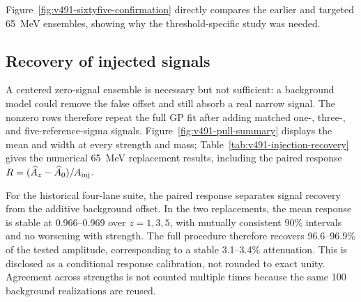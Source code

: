 Figure~\ref{fig:v491-sixtyfive-confirmation} directly compares the earlier and targeted
65~MeV ensembles, showing why the threshold-specific study was needed.

\subsection{Recovery of injected signals}

A centered zero-signal ensemble is necessary but not sufficient: a background model
could remove the false offset and still absorb a real narrow signal.  The nonzero
rows therefore repeat the full GP fit after adding matched one-, three-, and
five-reference-sigma signals.  Figure~\ref{fig:v491-pull-summary} displays the mean
and width at every strength and mass; Table~\ref{tab:v491-injection-recovery} gives
the numerical 65~MeV replacement results, including the paired response
$R=(\widehat A_z-\widehat A_0)/A_{\rm inj}$.

For the historical four-lane suite, the paired response separates signal recovery
from the additive background offset.  In the two replacements, the mean response is
stable at 0.966--0.969 over $z=1,3,5$, with mutually consistent 90\% intervals and no
worsening with strength.  The full procedure therefore recovers 96.6--96.9\% of the
tested amplitude, corresponding to a stable 3.1--3.4\% attenuation.  This is
disclosed as a conditional response calibration, not rounded to exact unity.
Agreement across strengths is not counted multiple times because the same 100
background realizations are reused.

